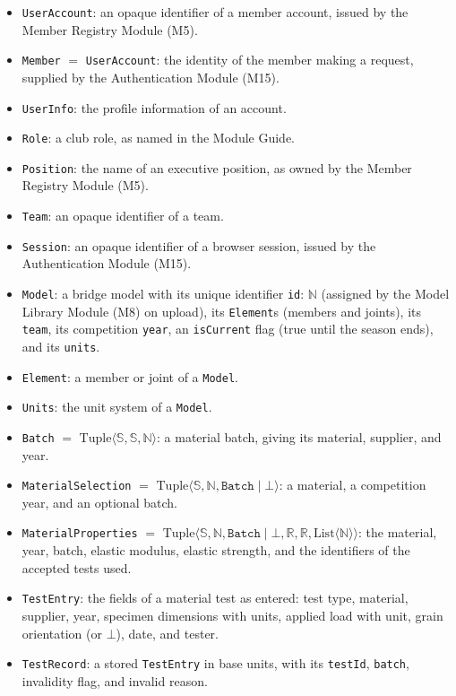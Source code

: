 \documentclass[12pt, titlepage]{article}
\begin{document}
\begin{itemize}
  \item \texttt{UserAccount}: an opaque identifier of a member account, issued by the Member Registry Module (M5).
  \item \texttt{Member} $=$ \texttt{UserAccount}: the identity of the member making a request, supplied by the Authentication Module (M15).
  \item \texttt{UserInfo}: the profile information of an account.
  \item \texttt{Role}: a club role, as named in the Module Guide.
  \item \texttt{Position}: the name of an executive position, as owned by the Member Registry Module (M5).
  \item \texttt{Team}: an opaque identifier of a team.
  \item \texttt{Session}: an opaque identifier of a browser session, issued by the Authentication Module (M15).
  \item \texttt{Model}: a bridge model with its unique identifier \texttt{id}: $\mathbb{N}$ (assigned by the Model Library Module (M8) on upload), its \texttt{Element}s (members and joints), its \texttt{team}, its competition \texttt{year}, an \texttt{isCurrent} flag (true until the season ends), and its \texttt{units}.
  \item \texttt{Element}: a member or joint of a \texttt{Model}.
  \item \texttt{Units}: the unit system of a \texttt{Model}.
  \item \texttt{Batch} $=$ $\text{Tuple}\langle \mathbb{S}, \mathbb{S}, \mathbb{N} \rangle$: a material batch, giving its material, supplier, and year.
  \item \texttt{MaterialSelection} $=$ $\text{Tuple}\langle \mathbb{S}, \mathbb{N}, \texttt{Batch} \mid \bot \rangle$: a material, a competition year, and an optional batch.
  \item \texttt{MaterialProperties} $=$ $\text{Tuple}\langle \mathbb{S}, \mathbb{N}, \texttt{Batch} \mid \bot, \mathbb{R}, \mathbb{R}, \text{List}\langle \mathbb{N} \rangle \rangle$: the material, year, batch, elastic modulus, elastic strength, and the identifiers of the accepted tests used.
  \item \texttt{TestEntry}: the fields of a material test as entered: test type, material, supplier, year, specimen dimensions with units, applied load with unit, grain orientation (or $\bot$), date, and tester.
  \item \texttt{TestRecord}: a stored \texttt{TestEntry} in base units, with its \texttt{testId}, \texttt{batch}, invalidity flag, and invalid reason.

\end{itemize}
\end{document}
